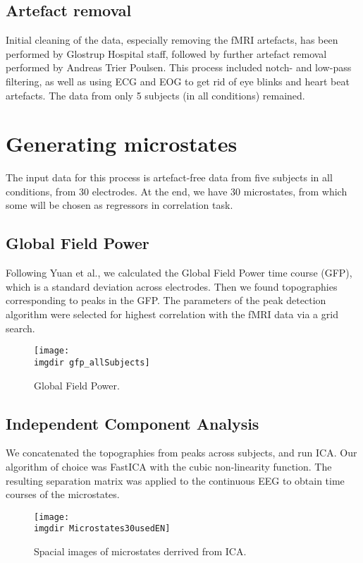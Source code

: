 \documentclass{article}
\newcommand{\imgdir}{Images/} %
\begin{document}
\subsection{Artefact removal}
Initial cleaning of the data, especially removing the fMRI artefacts, has been performed by Glostrup Hospital staff, followed by further artefact removal performed by Andreas Trier Poulsen. This process included notch- and low-pass filtering, as well as using ECG and EOG to get rid of eye blinks and heart beat artefacts. 
The data from only 5 subjects (in all conditions) remained.

\section{Generating microstates}
The input data for this process is artefact-free data from five subjects in all conditions, from 30 electrodes. At the end, we have 30 microstates, from which some will be chosen as regressors in correlation task. 
\subsection{Global Field Power}
Following Yuan et al., we calculated the Global Field Power time course (GFP), which is a standard deviation across electrodes. Then we found topographies corresponding to peaks in the GFP. The parameters of the peak detection algorithm were selected for highest correlation with the fMRI data via a grid search.

\begin{figure}[!ht]
    \centering
    \texttt{[image: \\imgdir gfp\_allSubjects]}
    \caption{Global Field Power.}
    \label{fig:gfp}
\end{figure}

\subsection{Independent Component Analysis}
We concatenated the topographies from peaks across subjects, and run ICA. Our algorithm of choice was FastICA \cite{fast_robust} with the cubic non-linearity function. The resulting separation matrix was applied to the continuous EEG to obtain time courses of the microstates.

\begin{figure}[!ht]
    \centering
    \texttt{[image: \\imgdir Microstates30usedEN]}
    \caption{Spacial images of microstates derrived from ICA.}
    \label{fig:microstates}
\end{figure}
\end{document}

